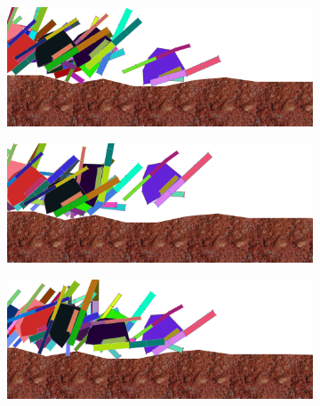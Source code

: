             \begin{figure}[H]
              \centering
              \begin{subfigure}[b]{0.45\textwidth}
                \includegraphics[width=\linewidth,center]{graphics/simulation-results/4_gen3000_1}
                \caption{\label{fig:gen3000_1}}
              \end{subfigure}
              \begin{subfigure}[b]{0.45\textwidth}
                \includegraphics[width=\linewidth,center]{graphics/simulation-results/4_gen3000_2}
                \caption{\label{fig:gen3000_2}}
              \end{subfigure}
              \begin{subfigure}[b]{0.45\textwidth}
                \includegraphics[width=\linewidth,center]{graphics/simulation-results/4_gen3000_3}
                \caption{\label{fig:gen3000_3}}
              \end{subfigure}
              \begin{subfigure}[b]{0.45\textwidth}

\end{subfigure}
\end{figure}
